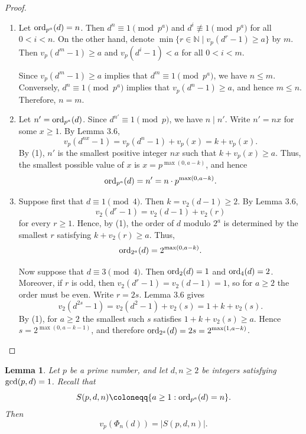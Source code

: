 \documentclass[10pt,leqno]{amsart}
\newtheorem{lemma}[theorem]{Lemma}
\theoremstyle{definition}
\theoremstyle{remark}
\numberwithin{equation}{section}
\def\nn{\mathbb{N}}
\def\gcd{{\rm gcd}}
\def\ord{{\rm ord}}
\begin{document}
\begin{proof}~
    \begin{enumerate}
        \item Let $\ord_{p^a}(d) = n$. Then $d^n\equiv 1\pmod {p^a}$ and $d^i\not\equiv 1\pmod {p^a}$ for all $0<i<n$. On the other hand, denote $\min\{r\in\nn\mid v_p(d^r-1)\geq a\}$ by $m$. Then $v_p(d^m-1)\geq a$ and $v_p(d^i-1)<a$ for all $0< i<m$.

        Since $v_p(d^m-1)\geq a$ implies that $d^m\equiv 1\pmod{p^a}$, we have $n\leq m$. Conversely, $d^n\equiv 1\pmod{p^a}$ implies that $v_{p}(d^n-1)\geq a$, and hence $m\leq n$. Therefore, $n = m$.
        \item Let $n' = \ord_{p^a}(d)$. Since $d^{n'}\equiv 1\pmod p$, we have $n\mid n'$. Write $n' = nx$ for some $x\geq 1$. By Lemma 3.6, 
        $$v_p(d^{nx}-1) = v_p(d^n-1)+v_p(x) = k+v_p(x).$$
        By (1), $n'$ is the smallest positive integer $nx$ such that $k+v_p(x)\geq a$. Thus, the smallest possible value of $x$ is $x = p^{\max(0,a-k)}$, and hence
        $$\ord_{p^a}(d) = n' = n\cdot p^{\max(0,a-k)}.$$
        \item Suppose first that $d\equiv 1\pmod 4$. Then $k = v_2(d-1)\geq 2$. By Lemma 3.6,
        $$v_2(d^r-1) = v_2(d-1)+v_2(r)$$
        for every $r\geq 1$. Hence, by (1), the order of $d$ modulo $2^a$ is determined by the smallest $r$ satisfying $k+v_2(r)\geq a$. Thus,
        $$\ord_{2^a}(d) = 2^{\max(0,a-k)}.$$

        Now suppose that $d\equiv 3\pmod 4$. Then $\ord_2(d) = 1$ and $\ord_4(d) = 2$. Moreover, if $r$ is odd, then $v_2(d^r-1) = v_2(d-1) = 1$, so for $a\geq 2$ the order must be even. Write $r = 2s$. Lemma 3.6 gives
        $$v_2(d^{2s}-1) = v_2(d^2-1)+v_2(s) = 1+k+v_2(s).$$
        By (1), for $a\geq 2$ the smallest such $s$ satisfies $1+k+v_2(s)\geq a$. Hence $s = 2^{\max(0,a-k-1)}$, and therefore $\ord_{2^a}(d) = 2s = 2^{\max(1,a-k)}$.
    \end{enumerate}
\end{proof}

\begin{lemma}
    Let $p$ be a prime number, and let $d,n\geq 2$ be integers satisfying $\gcd(p,d) = 1$. Recall that
    $$S(p,d,n)\coloneqq\{a\geq 1:\ord_{p^a}(d) = n\}.$$
    Then 
    $$v_p(\Phi_n(d)) = |S(p,d,n)|.$$
\end{lemma}
\end{document}
